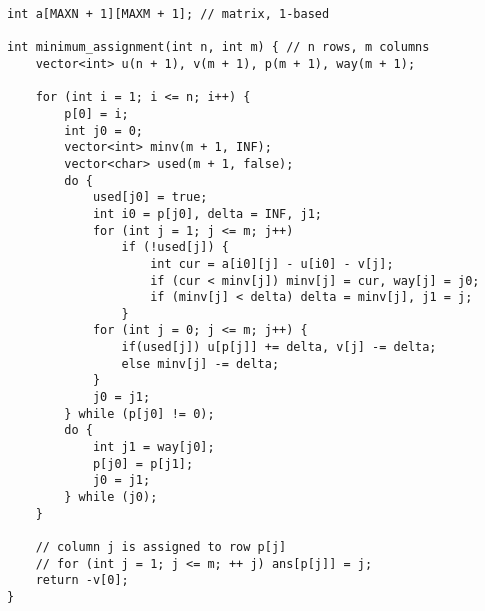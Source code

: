 \documentclass{article}
\begin{document}
\begin{lstlisting}
int a[MAXN + 1][MAXM + 1]; // matrix, 1-based

int minimum_assignment(int n, int m) { // n rows, m columns
	vector<int> u(n + 1), v(m + 1), p(m + 1), way(m + 1);

	for (int i = 1; i <= n; i++) {
		p[0] = i;
		int j0 = 0;
		vector<int> minv(m + 1, INF);
		vector<char> used(m + 1, false);
		do {
			used[j0] = true;
			int i0 = p[j0], delta = INF, j1;
			for (int j = 1; j <= m; j++)
				if (!used[j]) {
					int cur = a[i0][j] - u[i0] - v[j];
					if (cur < minv[j]) minv[j] = cur, way[j] = j0;
					if (minv[j] < delta) delta = minv[j], j1 = j;
				}
			for (int j = 0; j <= m; j++) {
				if(used[j]) u[p[j]] += delta, v[j] -= delta;
				else minv[j] -= delta;
			}
			j0 = j1;
		} while (p[j0] != 0);
		do {
			int j1 = way[j0];
			p[j0] = p[j1];
			j0 = j1;
		} while (j0);
	}

	// column j is assigned to row p[j]
	// for (int j = 1; j <= m; ++ j) ans[p[j]] = j;
	return -v[0];
}
\end{lstlisting}
\end{document}
